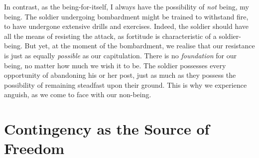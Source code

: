 In contrast, as the being-for-itself, I always have the possibility of \emph{not} being, my being. The soldier undergoing bombardment might be trained to withstand fire, to have undergone extensive drills and exercises. Indeed, the soldier should have all the means of resisting the attack, as fortitude is characteristic of a soldier-being. But yet, at the moment of the bombardment, we realise that our resistance is just as equally \emph{possible} as our capitulation. There is no \emph{foundation} for our being, no matter how much we wish it to be. The soldier possesses every opportunity of abandoning his or her post, just as much as they possess the possibility of remaining steadfast upon their ground.  This is why we experience anguish, as we come to face with our non-being.


\section{Contingency as the Source of Freedom}



% 

